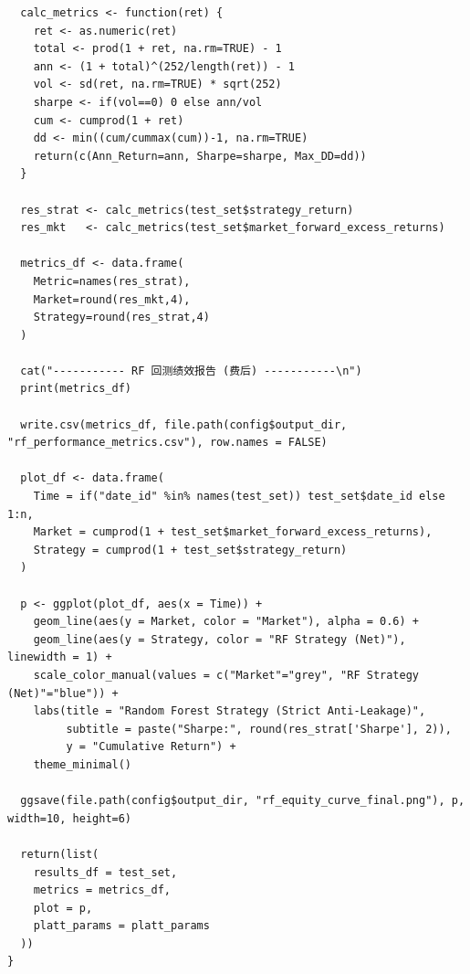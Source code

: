 \documentclass[11pt, a4paper]{article}
\begin{document}
\begin{verbatim}
  calc_metrics <- function(ret) {
    ret <- as.numeric(ret)
    total <- prod(1 + ret, na.rm=TRUE) - 1
    ann <- (1 + total)^(252/length(ret)) - 1
    vol <- sd(ret, na.rm=TRUE) * sqrt(252)
    sharpe <- if(vol==0) 0 else ann/vol
    cum <- cumprod(1 + ret)
    dd <- min((cum/cummax(cum))-1, na.rm=TRUE)
    return(c(Ann_Return=ann, Sharpe=sharpe, Max_DD=dd))
  }
  
  res_strat <- calc_metrics(test_set$strategy_return)
  res_mkt   <- calc_metrics(test_set$market_forward_excess_returns)
  
  metrics_df <- data.frame(
    Metric=names(res_strat), 
    Market=round(res_mkt,4), 
    Strategy=round(res_strat,4)
  )
  
  cat("----------- RF 回测绩效报告 (费后) -----------\n")
  print(metrics_df)
  
  write.csv(metrics_df, file.path(config$output_dir, "rf_performance_metrics.csv"), row.names = FALSE)
  
  plot_df <- data.frame(
    Time = if("date_id" %in% names(test_set)) test_set$date_id else 1:n,
    Market = cumprod(1 + test_set$market_forward_excess_returns),
    Strategy = cumprod(1 + test_set$strategy_return)
  )
  
  p <- ggplot(plot_df, aes(x = Time)) +
    geom_line(aes(y = Market, color = "Market"), alpha = 0.6) +
    geom_line(aes(y = Strategy, color = "RF Strategy (Net)"), linewidth = 1) +
    scale_color_manual(values = c("Market"="grey", "RF Strategy (Net)"="blue")) +
    labs(title = "Random Forest Strategy (Strict Anti-Leakage)",
         subtitle = paste("Sharpe:", round(res_strat['Sharpe'], 2)),
         y = "Cumulative Return") +
    theme_minimal()
  
  ggsave(file.path(config$output_dir, "rf_equity_curve_final.png"), p, width=10, height=6)
  
  return(list(
    results_df = test_set, 
    metrics = metrics_df, 
    plot = p,
    platt_params = platt_params
  ))
}
\end{verbatim}
\end{document}
